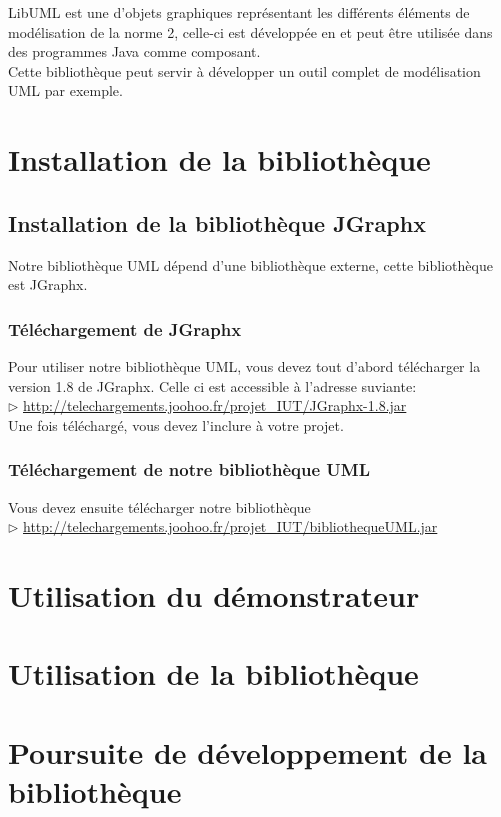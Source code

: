 \documentclass[12pt,a4paper,openany]{report}
\begin{document}
	\maketitle
	\newpage
	\tableofcontents
	\vspace{20px}
	LibUML est une 
	d'objets graphiques représentant les différents éléments de modélisation de la norme 
	2, celle-ci est développée en 
	et peut être utilisée dans des programmes Java comme composant. \\
	Cette bibliothèque peut servir à développer un outil complet de modélisation UML par exemple.
	\newpage
	\chapter{Installation de la bibliothèque}
	\section{Installation de la bibliothèque JGraphx}
	Notre bibliothèque UML dépend d'une bibliothèque externe, cette bibliothèque est JGraphx.
	\subsection{Téléchargement de JGraphx}
	Pour utiliser notre bibliothèque UML, vous devez tout d'abord télécharger la version 1.8 de JGraphx. Celle ci est accessible à l'adresse suviante:\\
	$\rhd$ \url{http://telechargements.joohoo.fr/projet\_IUT/JGraphx-1.8.jar}\\
	Une fois téléchargé, vous devez l'inclure à votre projet.
	\subsection{Téléchargement de notre bibliothèque UML}
	Vous devez ensuite télécharger notre bibliothèque\\
	$\rhd$ \url{http://telechargements.joohoo.fr/projet\_IUT/bibliothequeUML.jar}\\

	\chapter{Utilisation du démonstrateur}
	\chapter{Utilisation de la bibliothèque}
	\chapter{Poursuite de développement de la bibliothèque}				

	\closeout\glossaireVar
	\appendix
	\begin{sortedlist}
    
	\end{sortedlist}
\end{document}
